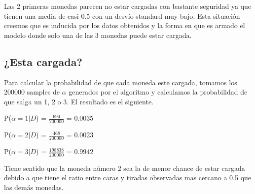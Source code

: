 Las 2 primeras monedas parecen no estar cargadas con bastante seguridad ya que tienen una media de casi 0.5 con un desvío standard muy bajo. Esta situación creemos que es inducida por los datos obtenidos y la forma en que es armado el modelo donde solo una de las 3 monedas puede estar cargada.

\subsection{¿Esta cargada?}

Para calcular la probabilidad de que cada moneda este cargada, tomamos los 200000 samples de $\alpha$ generados por el algoritmo y calculamos la probabilidad de que salga un 1, 2 o 3. El resultado es el siguiente. 


P($\alpha = 1 | D$) = $\frac{694}{200000}$ = 0.0035

P($\alpha = 2 | D$) = $\frac{468}{200000}$ = 0.0023

P($\alpha = 3 | D$) = $\frac{198838}{200000}$ = 0.9942

Tiene sentido que la moneda número 2 sea la de menor chance de estar cargada debido a que tiene el ratio entre caras y tiradas observadas mas cercano a 0.5 que las demás monedas.
